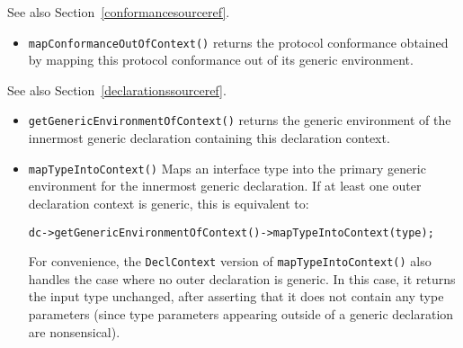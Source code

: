 \documentclass[../generics]{subfiles}
\begin{document}
See also Section~\ref{conformancesourceref}.
\begin{itemize}
\item \texttt{mapConformanceOutOfContext()} returns the protocol conformance obtained by mapping this protocol conformance out of its generic environment.
\end{itemize}

See also Section~\ref{declarationssourceref}.
\begin{itemize}
\item \texttt{getGenericEnvironmentOfContext()} returns the generic environment of the innermost generic declaration containing this declaration context.
\item \texttt{mapTypeIntoContext()} Maps an interface type into the primary generic environment for the innermost generic declaration. If at least one outer declaration context is generic, this is equivalent to:
\begin{Verbatim}
dc->getGenericEnvironmentOfContext()->mapTypeIntoContext(type);
\end{Verbatim}
For convenience, the \texttt{DeclContext} version of \texttt{mapTypeIntoContext()} also handles the case where no outer declaration is generic. In this case, it returns the input type unchanged, after asserting that it does not contain any type parameters (since type parameters appearing outside of a generic declaration are nonsensical).
\end{itemize}
\end{document}

